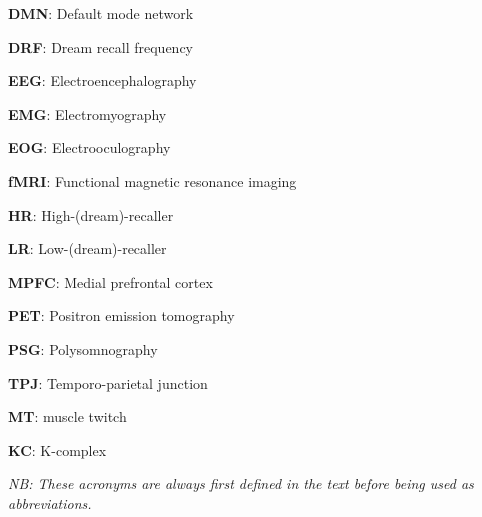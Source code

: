 \label{sec:acronyms}
\vspace*{-10mm}

\begin{multicols}{2}

\textbf{DMN}: Default mode network

\textbf{DRF}: Dream recall frequency

\textbf{EEG}: Electroencephalography

\textbf{EMG}: Electromyography

\textbf{EOG}: Electrooculography

\textbf{fMRI}: Functional magnetic resonance imaging

\textbf{HR}: High-(dream)-recaller

\textbf{LR}: Low-(dream)-recaller

\textbf{MPFC}: Medial prefrontal cortex

\textbf{PET}: Positron emission tomography

\textbf{PSG}: Polysomnography

\textbf{TPJ}: Temporo-parietal junction

\textbf{MT}: muscle twitch

\textbf{KC}: K-complex
\end{multicols}

\textit{NB: These acronyms are always first defined in the text before being used as abbreviations.}
